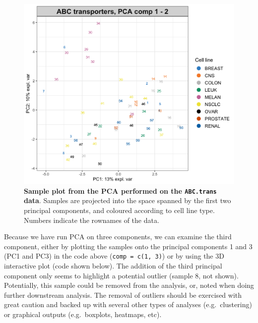 \documentclass[]{book}
\newenvironment{Shaded}{\begin{snugshade}}{\end{snugshade}}
\newcommand{\KeywordTok}[1]{\textcolor[rgb]{0.13,0.29,0.53}{\textbf{#1}}}
\newcommand{\DataTypeTok}[1]{\textcolor[rgb]{0.13,0.29,0.53}{#1}}
\newcommand{\DecValTok}[1]{\textcolor[rgb]{0.00,0.00,0.81}{#1}}
\newcommand{\StringTok}[1]{\textcolor[rgb]{0.31,0.60,0.02}{#1}}
\newcommand{\CommentTok}[1]{\textcolor[rgb]{0.56,0.35,0.01}{\textit{#1}}}
\newcommand{\OtherTok}[1]{\textcolor[rgb]{0.56,0.35,0.01}{#1}}
\newcommand{\OperatorTok}[1]{\textcolor[rgb]{0.81,0.36,0.00}{\textbf{#1}}}
\newcommand{\NormalTok}[1]{#1}
\begin{document}
\begin{Shaded}
\end{Shaded}

\begin{figure}

{\centering \includegraphics[width=0.5\linewidth]{Figures/PCA/pca-ABCtrans-group-1} 

}

\caption{\textbf{Sample plot from the PCA performed on
the \texttt{ABC.trans} data}. Samples are projected into the space
spanned by the first two principal components, and coloured according to
cell line type. Numbers indicate the rownames of the data.}\label{fig:pca-ABCtrans-group}
\end{figure}






Because we have run PCA on three components, we can examine the third
component, either by plotting the samples onto the principal components
1 and 3 (PC1 and PC3) in the code above (\texttt{comp\ =\ c(1,\ 3)}) or
by using the 3D interactive plot (code shown below). The addition of the
third principal component only seems to highlight a potential outlier
(sample 8, not shown). Potentially, this sample could be removed from
the analysis, or, noted when doing further downstream analysis. The
removal of outliers should be exercised with great caution and backed up
with several other types of analyses (e.g.~clustering) or graphical
outputs (e.g.~boxplots, heatmaps, etc).
\end{document}

